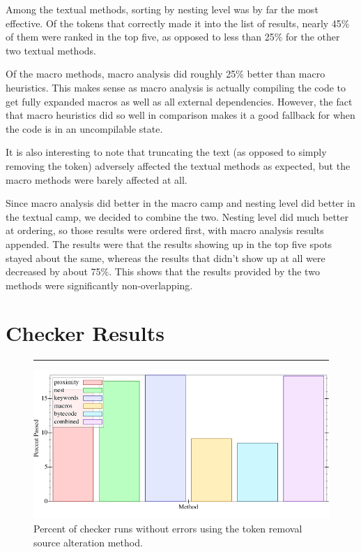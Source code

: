 \documentclass[ms,electronic,twosidetoc,letterpaper,chaptercenter,parttop,lol,lof,lot]{byumsphd}
\begin{document}
Among the textual methods, sorting by nesting level was by far the most effective.
Of the tokens that correctly made it into the list of results, nearly 45\% of them were ranked in the top five, as opposed to less than 25\% for the other two textual methods.

Of the macro methods, macro analysis did roughly 25\% better than macro heuristics.
This makes sense as macro analysis is actually compiling the code to get fully expanded macros as well as all external dependencies.
However, the fact that macro heuristics did so well in comparison makes it a good fallback for when the code is in an uncompilable state.

It is also interesting to note that truncating the text (as opposed to simply removing the token) adversely affected the textual methods as expected, but the macro methods were barely affected at all.

Since macro analysis did better in the macro camp and nesting level did better in the textual camp, we decided to combine the two.
Nesting level did much better at ordering, so those results were ordered first, with macro analysis results appended.
The results were that the results showing up in the top five spots stayed about the same, whereas the results that didn't show up at all were decreased by about 75\%.
This shows that the results provided by the two methods were significantly non-overlapping.

\section{Checker Results}

\begin{figure}[h]
\centering
\hrule
\includegraphics[width=1.0\textwidth]{../output/synthesis/checker/Remove-Percent.png}
\caption{Percent of checker runs without errors using the token removal source alteration method.}
\label{checker-remove-percent}
\end{figure}
\end{document}
